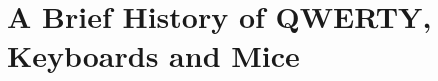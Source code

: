 \documentclass{article}
\begin{document}
  \section*{A Brief History of QWERTY, Keyboards and Mice}
  
\end{document}
